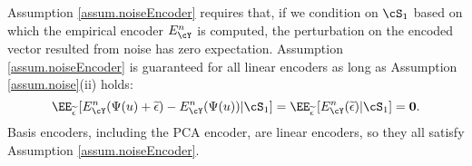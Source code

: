 \documentclass[11pt]{article} %
\begin{document}
Assumption \ref{assum.noiseEncoder} requires that, if we condition on $\cS_1$ based on which the empirical encoder $E^n_{\cY}$ is computed, the perturbation on the encoded vector resulted from noise  has zero expectation. %
Assumption \ref{assum.noiseEncoder} is guaranteed for all linear encoders as long as Assumption \ref{assum.noise}(ii) holds: %
$$\EE_{\widetilde{\epsilon}}\left[E^n_{\cY}(\Psi(u)+\widetilde{\epsilon})-E^n_{\cY}(\Psi(u))|\cS_1\right]=\EE_{\widetilde{\epsilon}}\left[E^n_{\cY}(\widetilde{\epsilon})|\cS_1\right] = \mathbf{0}.$$
Basis encoders, including the PCA encoder, are linear encoders, so they all satisfy Assumption \ref{assum.noiseEncoder}.




\end{document}
